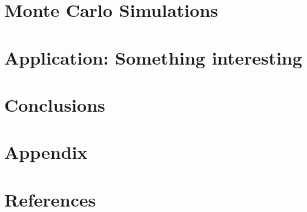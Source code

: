 \documentclass[
  letterpaper,
  DIV=11,
  numbers=noendperiod]{scrartcl}
\begin{document}
\hypertarget{monte-carlo-simulations}{%
\section{Monte Carlo Simulations}\label{monte-carlo-simulations}}

\hypertarget{application-something-interesting}{%
\section{\texorpdfstring{Application: \textbf{Something
interesting}}{Application: Something interesting}}\label{application-something-interesting}}

\hypertarget{conclusions}{%
\section{Conclusions}\label{conclusions}}

\hypertarget{appendix}{%
\section{Appendix}\label{appendix}}

\hypertarget{references}{%
\section*{References}\label{references}}
\end{document}
